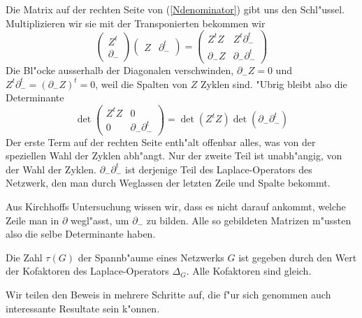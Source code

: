 Die Matrix auf der rechten Seite von (\ref{Ndenominator}) gibt uns den
Schl"ussel. Multiplizieren wir sie mit der Transponierten bekommen
wir
\begin{equation}
\begin{pmatrix}
Z^t\\
\partial_-
\end{pmatrix}
\begin{pmatrix}
Z&\partial_-^t
\end{pmatrix}
=\begin{pmatrix}
Z^tZ&Z^t\partial_-^t\\
\partial_-Z&\partial_-\partial_-^t
\end{pmatrix}
\end{equation}
Die Bl"ocke ausserhalb der Diagonalen verschwinden, $\partial_-Z=0$
und $Z^t\partial_-^t=(\partial_-Z)^t=0$, weil die Spalten von $Z$ Zyklen sind.
"Ubrig bleibt also die Determinante
\begin{equation}
\det
\begin{pmatrix}
Z^tZ&0\\
0&\partial_-\partial_-^t
\end{pmatrix}
=\det(Z^tZ)\det(\partial_-\partial_-^t)
\end{equation}
Der erste Term auf der rechten Seite enth"alt offenbar alles, was von
der speziellen Wahl der Zyklen abh"angt. Nur der zweite Teil ist
unabh"angig, von der Wahl der Zyklen. $\partial_-\partial_-^t$ ist derjenige
Teil des Laplace-Operators des Netzwerk, den man durch Weglassen der
letzten Zeile und Spalte bekommt.

Aus Kirchhoffs Untersuchung wissen
wir, dass es nicht darauf ankommt, welche Zeile man in $\partial$ 
wegl"asst, um $\partial_-$ zu bilden. Alle so gebildeten
Matrizen m"ussten also die selbe Determinante haben.

\begin{satz} Die Zahl $\tau(G)$
\label{matrixtreetheorem}
der Spannb"aume eines
Netzwerks $G$ ist gegeben durch den Wert der Kofaktoren des Laplace-Operators
$\Delta_G$.
Alle Kofaktoren sind gleich.
\end{satz}
Wir teilen den Beweis in mehrere Schritte auf, die f"ur sich genommen
auch interessante Resultate sein k"onnen. 

